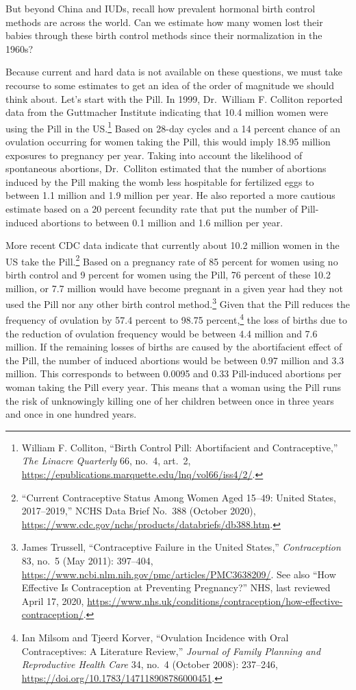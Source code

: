 \documentclass[
]{book}
\begin{document}
But beyond China and IUDs, recall how prevalent hormonal birth control methods are across the world. Can we estimate how many women lost their babies through these birth control methods since their normalization in the 1960s?

Because current and hard data is not available on these questions, we must take recourse to some estimates to get an idea of the order of magnitude we should think about. Let's start with the Pill. In 1999, Dr.~William F. Colliton reported data from the Guttmacher Institute indicating that 10.4 million women were using the Pill in the US.\footnote{William F. Colliton, ``Birth Control Pill: Abortifacient and Contraceptive,'' \emph{The Linacre Quarterly} 66, no.~4, art.~2, \url{https://epublications.marquette.edu/lnq/vol66/iss4/2/}.} Based on 28-day cycles and a 14 percent chance of an ovulation occurring for women taking the Pill, this would imply 18.95 million exposures to pregnancy per year. Taking into account the likelihood of spontaneous abortions, Dr.~Colliton estimated that the number of abortions induced by the Pill making the womb less hospitable for fertilized eggs to between 1.1 million and 1.9 million per year. He also reported a more cautious estimate based on a 20 percent fecundity rate that put the number of Pill-induced abortions to between 0.1 million and 1.6 million per year.

More recent CDC data indicate that currently about 10.2 million women in the US take the Pill.\footnote{``Current Contraceptive Status Among Women Aged 15--49: United States, 2017--2019,'' NCHS Data Brief No.~388 (October 2020), \url{https://www.cdc.gov/nchs/products/databriefs/db388.htm}.} Based on a pregnancy rate of 85 percent for women using no birth control and 9 percent for women using the Pill, 76 percent of these 10.2 million, or 7.7 million would have become pregnant in a given year had they not used the Pill nor any other birth control method.\footnote{James Trussell, ``Contraceptive Failure in the United States,'' \emph{Contraception} 83, no.~5 (May 2011): 397--404, \url{https://www.ncbi.nlm.nih.gov/pmc/articles/PMC3638209/}. See also ``How Effective Is Contraception at Preventing Pregnancy?'' NHS, last reviewed April 17, 2020, \url{https://www.nhs.uk/conditions/contraception/how-effective-contraception/}.} Given that the Pill reduces the frequency of ovulation by 57.4 percent to 98.75 percent,\footnote{Ian Milsom and Tjeerd Korver, ``Ovulation Incidence with Oral Contraceptives: A Literature Review,'' \emph{Journal of Family Planning and Reproductive Health Care} 34, no.~4 (October 2008): 237--246, \url{https://doi.org/10.1783/147118908786000451}.} the loss of births due to the reduction of ovulation frequency would be between 4.4 million and 7.6 million. If the remaining losses of births are caused by the abortifacient effect of the Pill, the number of induced abortions would be between 0.97 million and 3.3 million. This corresponds to between 0.0095 and 0.33 Pill-induced abortions per woman taking the Pill every year. This means that a woman using the Pill runs the risk of unknowingly killing one of her children between once in three years and once in one hundred years.
\end{document}
